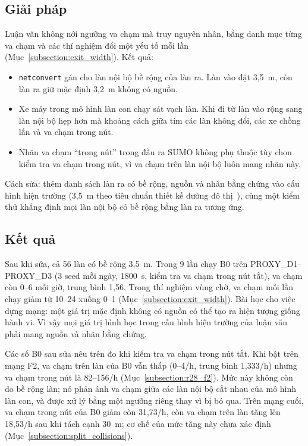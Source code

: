 \documentclass[../DoAn.tex]{subfiles}
\begin{document}
\subsection{Giải pháp}

Luận văn không nới ngưỡng va chạm mà truy nguyên nhân, bằng danh mục từng va chạm và các thí nghiệm đổi một yếu tố mỗi lần (Mục~\ref{subsection:exit_width}). Kết quả:
\begin{itemize}
    \item \texttt{netconvert} gán cho làn nội bộ bề rộng của làn ra. Làn vào đặt 3,5~m, còn làn ra giữ mặc định 3,2~m không có nguồn.
    \item Xe máy trong mô hình làn con chạy sát vạch làn. Khi đi từ làn vào rộng sang làn nội bộ hẹp hơn mà khoảng cách giữa tim các làn không đổi, các xe chồng lấn và va chạm trong nút.
    \item Nhãn va chạm ``trong nút'' trong đầu ra SUMO không phụ thuộc tùy chọn kiểm tra va chạm trong nút, vì va chạm trên làn nội bộ luôn mang nhãn này.
\end{itemize}
Cách sửa: thêm danh sách làn ra có bề rộng, nguồn và nhãn bằng chứng vào cấu hình hiện trường (3,5~m theo tiêu chuẩn thiết kế đường đô thị~\cite{tcvn13592}), cùng một kiểm thử khẳng định mọi làn nội bộ có bề rộng bằng làn ra tương ứng.

\subsection{Kết quả}

Sau khi sửa, cả 56 làn có bề rộng 3,5~m. Trong 9 lần chạy B0 trên PROXY\_D1--PROXY\_D3 (3 seed mỗi ngày, 1800~s, kiểm tra va chạm trong nút tắt), va chạm còn 0--6 mỗi giờ, trung bình 1,56. Trong thí nghiệm vùng chờ, va chạm mỗi lần chạy giảm từ 10--24 xuống 0--1 (Mục~\ref{subsection:exit_width}). Bài học cho việc dựng mạng: một giá trị mặc định không có nguồn có thể tạo ra hiện tượng giống hành vi. Vì vậy mọi giá trị hình học trong cấu hình hiện trường của luận văn phải mang nguồn và nhãn bằng chứng.

Các số B0 sau sửa nêu trên đo khi kiểm tra va chạm trong nút tắt. Khi bật trên mạng F2, va chạm trên làn của B0 vẫn thấp (0--4/h, trung bình 1,333/h) nhưng va chạm trong nút là 82--156/h (Mục~\ref{subsection:r28_f2}). Mức này không còn do bề rộng làn; nó phản ánh va chạm giữa các làn nội bộ cắt nhau của mô hình làn con, và được xử lý bằng một ngưỡng riêng thay vì bị bỏ qua. Trên mạng cuối, va chạm trong nút của B0 giảm còn 31,73/h, còn va chạm trên làn tăng lên 18,53/h sau khi tách cạnh 30~m; cơ chế của mức tăng này chưa xác định (Mục~\ref{subsection:split_collisions}).
\end{document}
